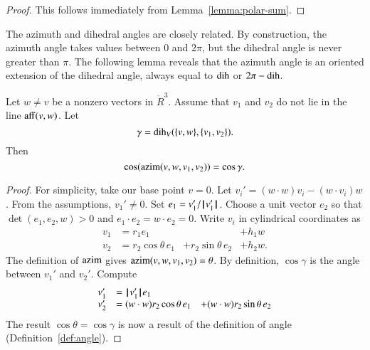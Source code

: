 \begin{proof} This follows immediately from 
Lemma~\ref{lemma:polar-sum}.
\end{proof}


The azimuth and dihedral angles are closely related.   By construction,
the azimuth angle takes values between $0$ and $2\pi$, but the dihedral
angle is never greater than $\pi$.  The following lemma reveals that
the azimuth angle is an oriented extension of the dihedral angle, always
equal to $\operatorname{dih}$ or $2\pi - \operatorname{dih}$.


\begin{lemma}\label{lemma:dih-azim}
Let $w\ne v$ be a nonzero vectors in $\ring{R}^3$.
  Assume that $v_1$ and $v_2$ do not lie in the line ${\operatorname{aff}}(v,w)$.
Let
  $$\gamma = \operatorname{dih}_V(\{v,w\},\{v_1,v_2\}).$$
  Then
    $$
    \cos({\operatorname{azim}}(v,w,v_1,v_2)) = \cos\gamma.
    $$
\end{lemma}

\begin{proof}  For simplicity,  take our base point $v=0$.
Let $v_i' = (w\cdot w) v_i - (w\cdot v_i) w$.  
From the assumptions, $v_1'\ne 0$.  Set $e_1 = v_1'/{{\hskip0.1em|\hskip-0.15em|\hskip0.1em}v'_1{\hskip0.1em|\hskip-0.15em|\hskip0.1em}}$.  Choose a unit vector
$e_2$ so that $\det(e_1,e_2,w)>0$ and $e_1\cdot e_2 = w\cdot e_2=0$.
Write $v_i$ in cylindrical coordinates as 
   $$
   \begin{array}{lllll}
     v_1 &= r_1 e_1 &    &+h_1 w\\
     v_2 &= r_2 \cos\theta\, e_1 &+ r_2 \sin\theta\, e_2 &+ h_2 w.
    \end{array}
   $$
The definition of ${\operatorname{azim}}$ gives ${\operatorname{azim}}(v,w,v_1,v_2)=\theta$.  
By definition, $\cos\gamma$ is the angle between $v_1'$ and $v_2'$.
Compute
   $$
   \begin{array}{lll}
     v_1' &= {{\hskip0.1em|\hskip-0.15em|\hskip0.1em}v'_1{\hskip0.1em|\hskip-0.15em|\hskip0.1em}} e_1 \\
     v_2' &= (w\cdot w) r_2 \cos\theta\, e_1 
       &+ (w\cdot w) r_2 \sin\theta\, e_2 \\
     \end{array}
   $$
The result $\cos\theta=\cos\gamma$ 
is now a result of the definition of angle 
(Definition~\ref{def:angle}).
\end{proof}





